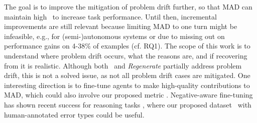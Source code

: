 The goal is to improve the mitigation of problem drift further, so that MAD can maintain high \metric\ to increase task performance.
Until then, incremental improvements are still relevant because limiting MAD to one turn might be infeasible, e.g., for (semi-)autonomous systems \citep{Slonim2021} or due to missing out on performance gains on 4-38\% of examples (cf. RQ1).
The scope of this work is to understand where problem drift occurs, what the reasons are, and if recovering from it is realistic.
Although both \judge\ and \textit{Regenerate} partially address problem drift, this is not a solved issue, as not all problem drift cases are mitigated.
One interesting direction is to fine-tune agents to make high-quality contributions to MAD, which could also involve our proposed metric \metric.
Negative-aware fine-tuning has shown recent success for reasoning tasks \citep{wang2024learningfailureintegratingnegative}, where our proposed dataset \dataset\ with human-annotated error types could be useful.